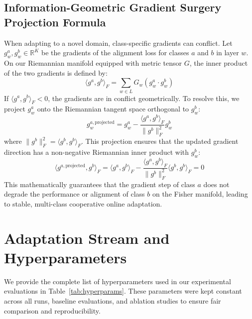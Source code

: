 \documentclass{article}
\theoremstyle{plain}
\theoremstyle{definition}
\theoremstyle{remark}
\begin{document}
\subsection{Information-Geometric Gradient Surgery Projection Formula}

When adapting to a novel domain, class-specific gradients can conflict. Let $g^a_w, g^b_w \in \mathbb{R}^K$ be the gradients of the alignment loss for classes $a$ and $b$ in layer $w$.
On our Riemannian manifold equipped with metric tensor $G$, the inner product of the two gradients is defined by:
\begin{equation}
  \langle g^a, g^b \rangle_F = \sum_{w \in L} G_w \left( g^a_w \cdot g^b_w \right)
\end{equation}
If $\langle g^a, g^b \rangle_F < 0$, the gradients are in conflict geometrically. To resolve this, we project $g^a_w$ onto the Riemannian tangent space orthogonal to $g^b_w$:
\begin{equation}
  g^{a, \text{projected}}_w = g^a_w - \frac{\langle g^a, g^b \rangle_F}{\|g^b\|_F^2} g^b_w
\end{equation}
where $\|g^b\|_F^2 = \langle g^b, g^b \rangle_F$.
This projection ensures that the updated gradient direction has a non-negative Riemannian inner product with $g^b_w$:
\begin{equation}
  \langle g^{a, \text{projected}}, g^b \rangle_F = \langle g^a, g^b \rangle_F - \frac{\langle g^a, g^b \rangle_F}{\|g^b\|_F^2} \langle g^b, g^b \rangle_F = 0
\end{equation}
This mathematically guarantees that the gradient step of class $a$ does not degrade the performance or alignment of class $b$ on the Fisher manifold, leading to stable, multi-class cooperative online adaptation.

\section{Adaptation Stream and Hyperparameters}
\label{app:hyperparams}

We provide the complete list of hyperparameters used in our experimental evaluations in Table~\ref{tab:hyperparams}. These parameters were kept constant across all runs, baseline evaluations, and ablation studies to ensure fair comparison and reproducibility.
\end{document}
